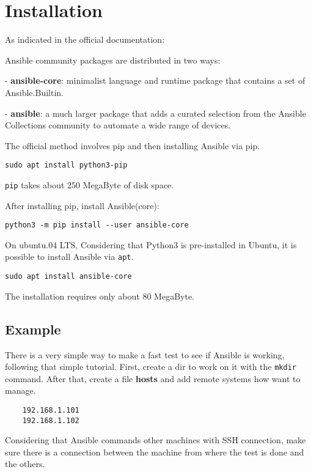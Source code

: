 \documentclass[12pt,a4paper,openright,twoside]{book}
\begin{document}
\section{Installation}
As indicated in the official documentation\cite{ansibleDocInstall}:

Ansible community packages are distributed in two ways:

- \textbf{ansible-core}: minimalist language and runtime package that contains a set of Ansible.Builtin.

- \textbf{ansible}: a much larger package that adds a curated selection from the Ansible Collections community to automate a wide range of devices.

The official method involves pip and then installing Ansible via pip.
\begin{lstlisting}
sudo apt install python3-pip
\end{lstlisting}

\texttt{pip} takes about 250 MegaByte of disk space.

After installing pip, install Ansible(core):

\begin{lstlisting}
python3 -m pip install --user ansible-core
\end{lstlisting}

On ubuntu.04 LTS,
Considering that Python3 is pre-installed in Ubuntu, it is possible to install Ansible via \texttt{apt}.

\begin{lstlisting}
sudo apt install ansible-core
\end{lstlisting}

The installation requires only about 80 MegaByte.

\subsection{Example}

There is a very simple way to make a fast test to see if Ansible is working, following that simple tutorial\cite{ansibleRIP}.
First, create a dir to work on it with the \texttt{mkdir} command.
After that, create a file \textbf{hosts} and add remote systems how want to manage.
\begin{lstlisting}
    192.168.1.101
    192.168.1.102
\end{lstlisting}

Considering that Ansible commands other machines with SSH connection, make sure there is a connection between the machine from where the test is done and the others.
\end{document}
